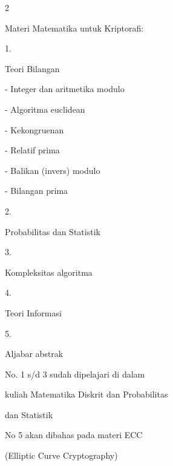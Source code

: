 \documentclass{article}
\begin{document}

2

Materi Matematika untuk Kriptorafi:

1.

Teori Bilangan


- Integer dan aritmetika modulo


- Algoritma euclidean


- Kekongruenan


- Relatif prima


- Balikan (invers) modulo


- Bilangan prima

2.

Probabilitas dan Statistik

3.

Kompleksitas algoritma

4.

Teori Informasi

5.

Aljabar abstrak 

No. 1 s/d 3 sudah dipelajari di dalam 

kuliah Matematika Diskrit dan Probabilitas 

dan Statistik

No 5 akan dibahas pada materi ECC 

(Elliptic Curve Cryptography)
\end{document}
